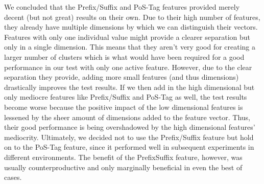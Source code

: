 We concluded that the Prefix/Suffix and PoS-Tag features provided merely decent (but not great) results on their own. Due to their high number of features, they already have multiple dimensions by which we can distinguish their vectors. Features with only one individual value might provide a clearer separation but only in a single dimension. This means that they aren’t very good for creating a larger number of clusters which is what would have been required for a good performance in our test with only one active feature. However, due to the clear separation they provide, adding more small features (and thus dimensions) drastically improves the test results. If we then add in the high dimensional but only mediocre features like Prefix/Suffix and PoS-Tag as well, the test results become worse because the positive impact of the low dimensional features is lessened by the sheer amount of dimensions added to the feature vector. Thus, their good performance is being overshadowed by the high dimensional features’ mediocrity.
Ultimately, we decided not to use the Prefix/Suffix feature but hold on to the PoS-Tag feature, since it performed well in subsequent experiments in different environments. The benefit of the PrefixSuffix feature, however, was usually counterproductive and only marginally beneficial in even the best of cases.

